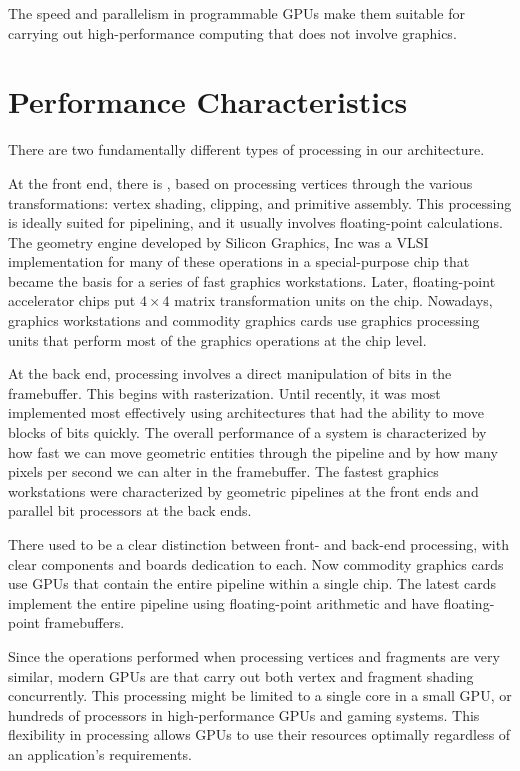 \documentclass[../COS3712_Notes.tex]{subfiles}
\begin{document}
      The speed and parallelism in programmable GPUs
      make them suitable for carrying out high-performance computing
      that does not involve graphics.

    \section{Performance Characteristics}
      There are two fundamentally different types of processing in our architecture.

      At the front end,
      there is ,
      based on processing vertices through the various transformations:
      vertex shading, clipping, and primitive assembly.
      This processing is ideally suited for pipelining,
      and it usually involves floating-point calculations.
      The geometry engine developed by Silicon Graphics, Inc
      was a VLSI implementation for many of these operations
      in a special-purpose chip that became
      the basis for a series of fast graphics workstations.
      Later, floating-point accelerator chips put
      $4 \times 4$ matrix transformation units on the chip.
      Nowadays, graphics workstations and commodity graphics cards use
      graphics processing units that perform most of the graphics operations
      at the chip level.

      At the back end,
      processing involves a direct manipulation of bits in the framebuffer.
      This begins with rasterization.
      Until recently, it was most implemented most effectively using architectures
      that had the ability to move blocks of bits quickly.
      The overall performance of a system is characterized by
      how fast we can move geometric entities through the pipeline
      and by how many pixels per second we can alter in the framebuffer.
      The fastest graphics workstations were characterized by
      geometric pipelines at the front ends
      and parallel bit processors at the back ends.

      There used to be a clear distinction between
      front- and back-end processing,
      with clear components and boards dedication to each.
      Now commodity graphics cards use GPUs that contain the entire pipeline
      within a single chip.
      The latest cards implement the entire pipeline using floating-point arithmetic
      and have floating-point framebuffers.

      Since the operations performed when processing vertices and fragments are very similar,
      modern GPUs are 
      that carry out both vertex and fragment shading concurrently.
      This processing might be limited to a single core in a small GPU,
      or hundreds of processors in high-performance GPUs and gaming systems.
      This flexibility in processing allows GPUs to use their resources optimally
      regardless of an application's requirements.
\end{document}
